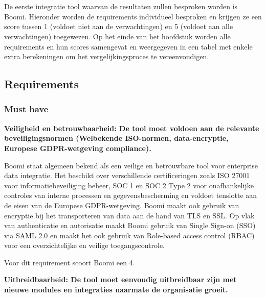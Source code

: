 \chapter{}
\label{ch:Boomi}

De eerste integratie tool waarvan de resultaten zullen besproken worden is Boomi. Hieronder worden de requirements individueel besproken en krijgen ze een score tussen 1 (voldoet niet aan de verwachtingen) en 5 (voldoet aan alle verwachtingen) toegewezen. Op het einde van het hoofdstuk worden alle requirements en hun scores samengevat en weergegeven in een tabel met enkele extra berekeningen om het vergelijkingsproces te vereenvoudigen.

\section{Requirements}%
\label{RequirementsBoomi}

\subsection{Must have}%
\label{MustHaveBoomi}

\textbf{Veiligheid en betrouwbaarheid: De tool moet voldoen aan de relevante beveiligingsnormen (Welbekende ISO-normen, data-encryptie, Europese GDPR-wetgeving compliance).}

\vspace{\baselineskip}

Boomi staat algemeen bekend als een veilige en betrouwbare tool voor enterprise data integratie. Het beschikt over verschillende certificeringen zoals ISO 27001 voor informatiebeveiliging beheer, SOC 1 en SOC 2 Type 2 voor onafhankelijke controles van interne processen en gegevensbescherming en voldoet tenslotte aan de eisen van de Europese GDPR-wetgeving. Boomi maakt ook gebruik van encryptie bij het transporteren van data aan de hand van TLS en SSL. Op vlak van authenticatie en autorisatie maakt Boomi gebruik van Single Sign-on (SSO) via SAML 2.0 en maakt het ook gebruik van Role-based access control (RBAC) voor een overzichtelijke en veilige toegangscontrole.

Voor dit requirement scoort Boomi een 4.

\vspace{\baselineskip}

\textbf{Uitbreidbaarheid: De tool moet eenvoudig uitbreidbaar zijn met nieuwe modules en integraties naarmate de organisatie groeit.}

